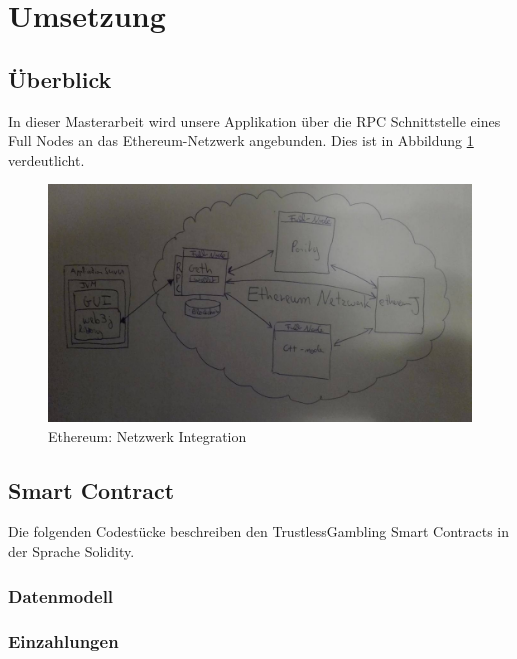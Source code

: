 \section{Umsetzung}

\subsection{Überblick}


In dieser Masterarbeit wird unsere Applikation über die RPC Schnittstelle eines Full Nodes an das Ethereum-Netzwerk angebunden. Dies ist in Abbildung \ref{fig:ethereum_integration} verdeutlicht.
 
\begin{figure}
\centering
\includegraphics[width=1\linewidth]{Figures/ethereum_integration}
\decoRule
\caption{Ethereum: Netzwerk Integration}
\label{fig:ethereum_integration}
\end{figure}


\subsection{Smart Contract}
Die folgenden Codestücke beschreiben den TrustlessGambling Smart Contracts in der Sprache Solidity.
\subsubsection{Datenmodell}



\subsubsection{Einzahlungen}



